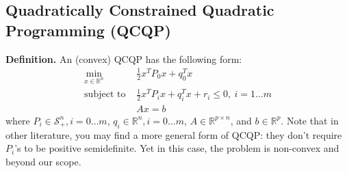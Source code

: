 \documentclass[
]{book}
\theoremstyle{definition}
\theoremstyle{definition}
\theoremstyle{definition}
\theoremstyle{definition}
\theoremstyle{remark}
\begin{document}
\hypertarget{quadratically-constrained-quadratic-programming-qcqp}{%
\subsection{Quadratically Constrained Quadratic Programming (QCQP)}\label{quadratically-constrained-quadratic-programming-qcqp}}

\textbf{Definition.} An (convex) QCQP has the following form:
\begin{align}
   \label{eq:app-qcqpdef}
   \min_{x \in \mathbb{R}^n} \ & \frac{1}{2} x^T P_0 x + q_0^T x \\
   \text{subject to } & \frac{1}{2} x^T P_i x + q_i^T x + r_i \le 0, \ i = 1 \dots m \\
   & Ax = b
\end{align}
where \(P_i \in \mathcal{S}_+^n, i = 0 \dots m\), \(q_i \in \mathbb{R}^n, i = 0 \dots m\), \(A \in \mathbb{R}^{p \times n}\), and \(b \in \mathbb{R}^p\). Note that in other literature, you may find a more general form of QCQP: they don't require \(P_i\)'s to be positive semidefinite. Yet in this case, the problem is non-convex and beyond our scope.
\end{document}
